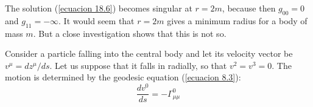 The solution (\ref{ecuacion 18.6}) becomes singular at $r = 2 m$, because then $g_{00}=0$ and $g_{11}=-\infty$. It 
would seem that $r=2m$ gives a minimum radius for a body of mass $m$. But a close investigation shows that this is not 
so.

Consider a particle falling into the central body and let its velocity vector be $v^\mu = d z^\mu / ds$. Let us suppose 
that it falls in radially, so that $v^2=v^3=0$. The motion is determined by the geodesic equation (\ref{ecuacion 8.3}):
\[
 \frac{dv^0}{ds} = - \Gamma^0_{\mu\mu}
\]
